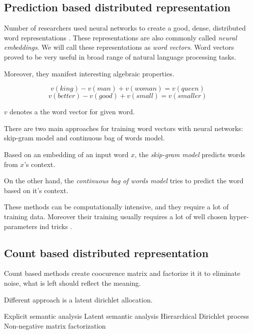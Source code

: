     \subsection{Prediction based distributed representation}
    
    Number of researchers used neural networks to create a good, dense, distributed word representations \cite{pennington2014glove} \cite{DBLP:conf/icml/LeM14} \cite{rong2014word2vec}. %
    These representations are also commonly called \emph{neural embeddings}.
    We will call these representations as \emph{word vectors}.
    Word vectors proved to be very useful in broad range of natural language processing tasks. 
    
    Moreover, they manifest interesting algebraic properties. 
    
    $$v(king) - v(man) + v(woman) = v(queen)$$
    $$v(better) - v(good) + v(small) = v(smaller)$$
    
    $v$ denotes a the word vector for given word.
    
    There are two main approaches for training word vectors with neural networks: skip-gram model and continuous bag of words model.
    
    Based on an embedding of an input word $x$, the \textit{skip-gram model} predicts words from $x$'s context.
    
    On the other hand, the \textit{continuous bag of words model} tries to predict the word based on it's context.
    
    These methods can be computationally intensive, and they require a lot of training data. 
    Moreover their training usually requires a lot of well chosen hyper-parameters ind tricks \cite{DBLP:journals/corr/MikolovSCCD13}. %
    

    \subsection{Count based distributed representation}
    \* %
    
    Count based methods create coocurence matrix and factorize it it to eliminate noise, 
    what is left should reflect the meaning. 
    
    Different approach is a latent dirichlet allocation.
    
    Explicit semantic analysis
    Latent semantic analysis
    Hierarchical Dirichlet process
    Non-negative matrix factorization
    

